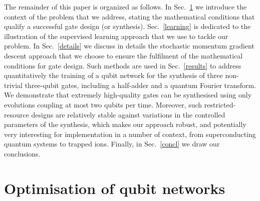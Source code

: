 The remainder of this paper is organized as follows. In Sec.~\ref{sec:optimisation} we introduce the context of the problem that we address, stating the mathematical conditions that qualify a successful gate design (or synthesis). Sec.~\ref{learning} is dedicated to the illustration of the supervised learning approach that we use to tackle our problem. In Sec.~\ref{details} we discuss in details the stochastic momentum gradient descent approach that we choose to ensure the fulfilment of the mathematical conditions for gate design. Such methods are used in Sec.~\ref{results} to address quantitatively the training of a qubit network for the synthesis of three non-trivial three-qubit gates, including a half-adder and a quantum Fourier transform. We demonstrate that extremely high-quality gates can be synthesised using only evolutions coupling at most two qubits per time. Moreover, such restricted-resource designs are relatively stable against variations in the controlled parameters of the synthesis, which makes our approach robust, and potentially very interesting for implementation in a number of context, from superconducting quantum systems to trapped ions.
Finally, in Sec.~\ref{concl} we draw our conclusions.

\section{Optimisation of qubit networks}
\label{sec:optimisation}


